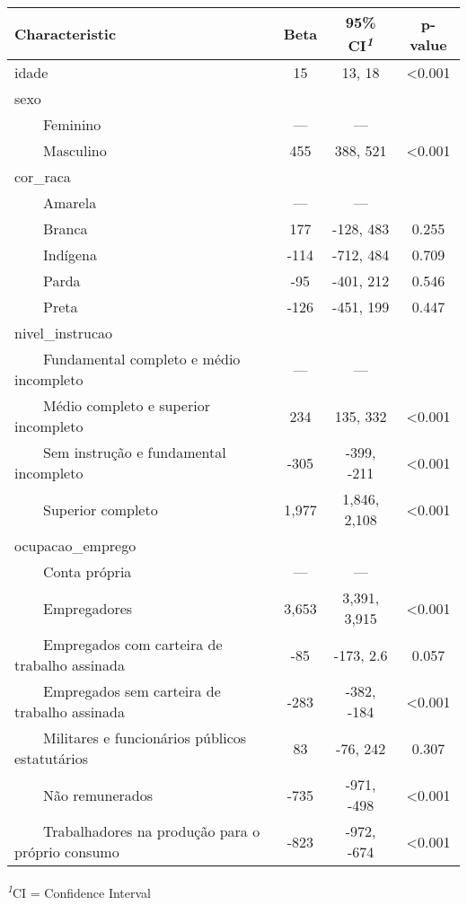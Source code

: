 \begingroup
\fontsize{12.0pt}{14.4pt}\selectfont
\setlength{\LTpost}{0mm}
\begin{longtable}{lccc}
\toprule
\textbf{Characteristic} & \textbf{Beta} & \textbf{95\% CI}\textsuperscript{\textit{1}} & \textbf{p-value} \\ 
\midrule\addlinespace[2.5pt]
idade & 15 & 13, 18 & <0.001 \\ 
sexo &  &  &  \\ 
    Feminino & — & — &  \\ 
    Masculino & 455 & 388, 521 & <0.001 \\ 
cor\_raca &  &  &  \\ 
    Amarela & — & — &  \\ 
    Branca & 177 & -128, 483 & 0.255 \\ 
    Indígena & -114 & -712, 484 & 0.709 \\ 
    Parda & -95 & -401, 212 & 0.546 \\ 
    Preta & -126 & -451, 199 & 0.447 \\ 
nivel\_instrucao &  &  &  \\ 
    Fundamental completo e médio incompleto & — & — &  \\ 
    Médio completo e superior incompleto & 234 & 135, 332 & <0.001 \\ 
    Sem instrução e fundamental incompleto & -305 & -399, -211 & <0.001 \\ 
    Superior completo & 1,977 & 1,846, 2,108 & <0.001 \\ 
ocupacao\_emprego &  &  &  \\ 
    Conta própria & — & — &  \\ 
    Empregadores & 3,653 & 3,391, 3,915 & <0.001 \\ 
    Empregados com carteira de trabalho assinada & -85 & -173, 2.6 & 0.057 \\ 
    Empregados sem carteira de trabalho assinada & -283 & -382, -184 & <0.001 \\ 
    Militares e funcionários públicos estatutários & 83 & -76, 242 & 0.307 \\ 
    Não remunerados & -735 & -971, -498 & <0.001 \\ 
    Trabalhadores na produção para o próprio consumo & -823 & -972, -674 & <0.001 \\ 
\bottomrule
\end{longtable}
\begin{minipage}{\linewidth}
\textsuperscript{\textit{1}}CI = Confidence Interval\\
\end{minipage}
\endgroup

